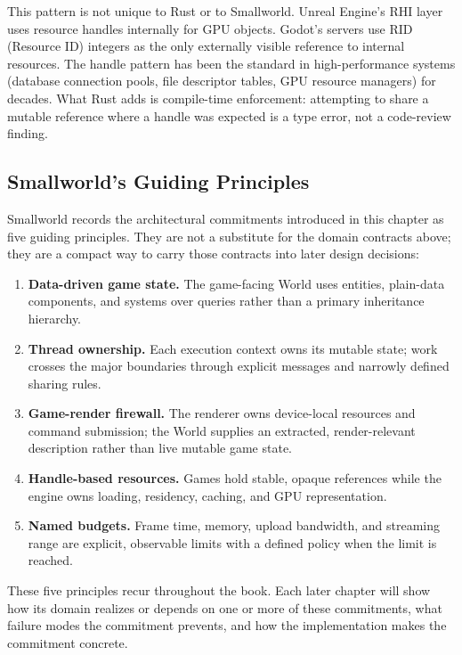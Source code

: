 \documentclass[
  11pt,
  letterpaper,
  DIV=11,
  numbers=noendperiod,
  twoside,
  open=right]{scrreprt}
\providecommand{\tightlist}{%
  \setlength{\itemsep}{0pt}\setlength{\parskip}{0pt}}
\begin{document}
This pattern is not unique to Rust or to Smallworld. Unreal Engine's RHI
layer uses resource handles internally for GPU objects. Godot's servers
use RID (Resource ID) integers as the only externally visible reference
to internal resources. The handle pattern has been the standard in
high-performance systems (database connection pools, file descriptor
tables, GPU resource managers) for decades. What Rust adds is
compile-time enforcement: attempting to share a mutable reference where
a handle was expected is a type error, not a code-review finding.

\subsection{Smallworld's Guiding
Principles}\label{smallworlds-guiding-principles}

Smallworld records the architectural commitments introduced in this
chapter as five guiding principles. They are not a substitute for the
domain contracts above; they are a compact way to carry those contracts
into later design decisions:

\begin{enumerate}
\def\labelenumi{\arabic{enumi}.}
\tightlist
\item
  \textbf{Data-driven game state.} The game-facing World uses entities,
  plain-data components, and systems over queries rather than a primary
  inheritance hierarchy.
\item
  \textbf{Thread ownership.} Each execution context owns its mutable
  state; work crosses the major boundaries through explicit messages and
  narrowly defined sharing rules.
\item
  \textbf{Game-render firewall.} The renderer owns device-local
  resources and command submission; the World supplies an extracted,
  render-relevant description rather than live mutable game state.
\item
  \textbf{Handle-based resources.} Games hold stable, opaque references
  while the engine owns loading, residency, caching, and GPU
  representation.
\item
  \textbf{Named budgets.} Frame time, memory, upload bandwidth, and
  streaming range are explicit, observable limits with a defined policy
  when the limit is reached.
\end{enumerate}

These five principles recur throughout the book. Each later chapter will
show how its domain realizes or depends on one or more of these
commitments, what failure modes the commitment prevents, and how the
implementation makes the commitment concrete.
\end{document}

